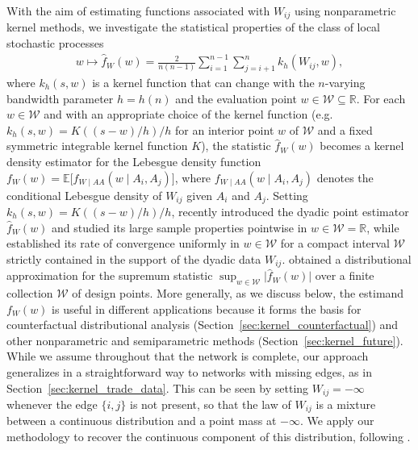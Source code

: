\documentclass[11pt,lof]{puthesis}
\newcommand{\R}{\ensuremath{\mathbb{R}}}
\newcommand{\E}{\ensuremath{\mathbb{E}}}
\newcommand{\cW}{\ensuremath{\mathcal{W}}}
\theoremstyle{break}
\theoremstyle{proof}
\begin{document}
With the aim of estimating functions associated with $W_{i j}$
using nonparametric kernel methods, we investigate the statistical
properties of the class of local stochastic processes
%
\begin{align}\label{eq:kernel_estimator}
w \mapsto \hat{f}_W(w)
= \frac{2}{n(n-1)} \sum_{i=1}^{n-1} \sum_{j=i+1}^n k_h(W_{i j},w),
\end{align}
%
where $k_h(s,w)$ is a kernel function that can change with the $n$-varying
bandwidth parameter $h=h(n)$ and the evaluation point $w \in \cW\subseteq \R$.
For each $w\in\cW$ and with an appropriate choice of the kernel function
(e.g.\ $k_h(s,w)=K((s-w)/h)/h$ for an interior point $w$ of $\cW$ and a
fixed symmetric integrable kernel function $K$), the statistic $\hat{f}_W(w)$
becomes a kernel density estimator for the Lebesgue density function
$f_W(w) = \E\big[f_{W \mid AA}(w \mid A_i,A_j)\big]$, where
$f_{W \mid AA}(w \mid A_i,A_j)$ denotes the conditional Lebesgue density of
$W_{i j}$ given $A_i$ and $A_j$. Setting $k_h(s,w)=K((s-w)/h)/h$,
\citet{graham2024kernel} recently introduced the dyadic point estimator
$\hat{f}_W(w)$ and studied its large sample properties pointwise in
$w\in\cW=\mathbb{R}$, while \citet{chiang2020empirical} established its rate of
convergence uniformly in $w\in\cW$ for a compact interval $\cW$ strictly
contained in the support of the dyadic data $W_{i j}$.
\citet{chiang2022inference} obtained a distributional approximation for the
supremum statistic $\sup_{w\in\cW}\big|\hat{f}_W(w)\big|$ over a finite
collection $\cW$ of design points. More generally, as we discuss below, the
estimand $f_W(w)$ is useful in different applications because it forms the
basis for counterfactual distributional analysis
(Section~\ref{sec:kernel_counterfactual}) and other nonparametric and
semiparametric
methods (Section~\ref{sec:kernel_future}). While we assume throughout
that the network is complete, our approach generalizes in a straightforward way
to networks with missing edges, as in Section~\ref{sec:kernel_trade_data}.
This can be
seen by setting $W_{i j} = -\infty$ whenever the edge $\{i, j\}$ is not
present, so that the law of $W_{i j}$ is a mixture between a continuous
distribution and a point mass at $-\infty$. We apply our methodology to
recover the continuous component of this distribution, following
\citet{chiang2022inference}.
\end{document}
